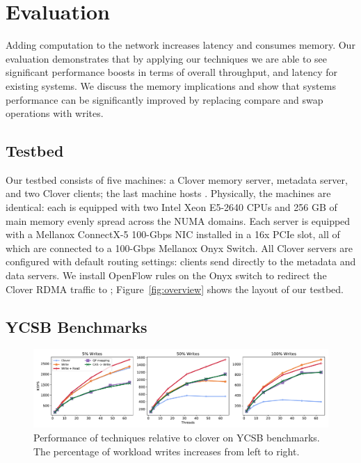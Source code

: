\section{Evaluation}
\label{s:results}

Adding computation to the network increases latency and consumes memory. Our
evaluation demonstrates that by applying our techniques we are able to see
significant performance boosts in terms of overall throughput, and latency for
existing systems. We discuss the memory implications and show that systems
performance can be significantly improved by replacing compare and swap
operations with writes.

\subsection{Testbed}

Our testbed consists of five machines: a Clover memory server, metadata server,
and two Clover clients; the last machine hosts {\sword}. Physically, the
machines are identical: each is equipped with two Intel Xeon E5-2640 CPUs and
256 GB of main memory evenly spread across the NUMA domains. Each server is
equipped with a Mellanox ConnectX-5 100-Gbps NIC installed in a 16x PCIe slot,
all of which are connected to a 100-Gbps Mellanox Onyx Switch. All Clover
servers are configured with default routing settings: clients send directly to
the metadata and data servers. We install OpenFlow rules on the Onyx switch to
redirect the Clover RDMA traffic to \sword; Figure~\ref{fig:overview} shows the
layout of our testbed.

\subsection{YCSB Benchmarks}

\begin{figure}
    \includegraphics[width=1.0\textwidth]{fig/full_system_performance.pdf}

    \caption{{Performance of \sword techniques relative to clover on YCSB
    benchmarks. The percentage of workload writes increases from left to
    right.}}

    \label{fig:full_system_performance}
\end{figure}

